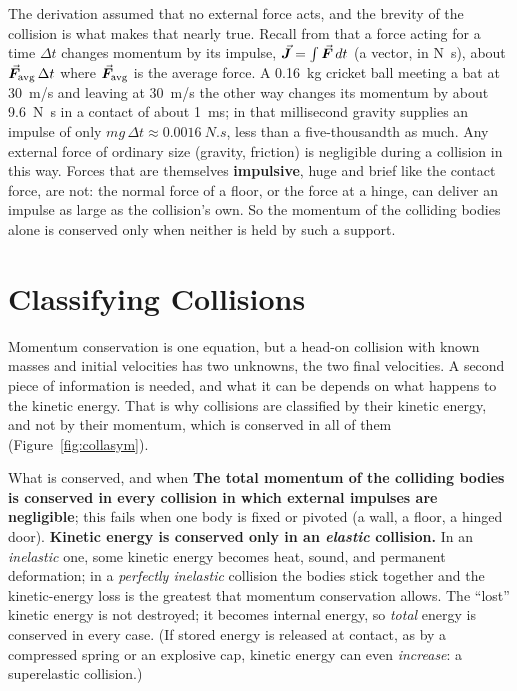 The derivation assumed that no external force acts, and the brevity of the collision is what makes that
nearly true. Recall from  that a force acting for a time $\Delta t$ changes momentum by its
impulse, $\vec{\bm{J}}=\int\vec{\bm{F}}\,dt$ (a vector, in \si{N.s}), about $\vec{\bm{F}}_{\text{avg}}\,\Delta t$ where
$\vec{\bm{F}}_{\text{avg}}$ is the average force. A \SI{0.16}{kg} cricket ball meeting a bat at
\SI{30}{m/s} and leaving at \SI{30}{m/s} the other way changes its momentum by about \SI{9.6}{N.s} in a
contact of about \SI{1}{ms}; in that millisecond gravity supplies an impulse of only
$mg\,\Delta t\approx\SI{0.0016}{N.s}$, less than a five-thousandth as much. Any external force of
ordinary size (gravity, friction) is negligible during a collision in this way. Forces that are
themselves \textbf{impulsive}, huge and brief like the contact force, are not: the normal force of a
floor, or the force at a hinge, can deliver an impulse as large as the collision's own. So the
momentum of the colliding bodies alone is conserved only when neither is held by such a support.

\section{Classifying Collisions}

Momentum conservation is one equation, but a head-on collision with known masses and initial velocities
has two unknowns, the two final velocities. A second piece of information is needed, and what it can be
depends on what happens to the kinetic energy. That is why collisions are classified by their kinetic
energy, and not by their momentum, which is conserved in all of them (Figure~\ref{fig:collasym}).

\begin{keybox}{What is conserved, and when}
\textbf{The total momentum of the colliding bodies is conserved in every collision in which external
impulses are negligible}; this fails when one body is fixed or pivoted (a wall, a floor, a hinged door).
\textbf{Kinetic energy is conserved
only in an \emph{elastic} collision.} In an \emph{inelastic} one, some kinetic energy becomes heat,
sound, and permanent deformation; in a \emph{perfectly inelastic} collision the bodies stick together
and the kinetic-energy loss is the greatest that momentum conservation allows. The ``lost'' kinetic
energy is not destroyed; it becomes internal energy, so \emph{total} energy is conserved in every case.
(If stored energy is released at contact, as by a compressed spring or an explosive cap, kinetic energy
can even \emph{increase}: a superelastic collision.)
\end{keybox}

